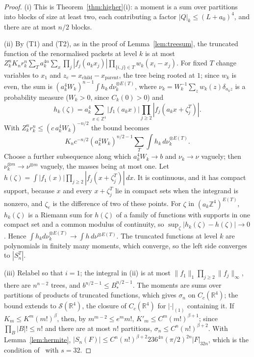 \documentclass[aps,prd,twocolumn,superscriptaddress,nofootinbib,longbibliography,floatfix,amsmath,amssymb,10pt]{revtex4-2}
\theoremstyle{definition}
\theoremstyle{remark}
\newcommand{\R}{\mathbb{R}}
\newcommand{\Z}{\mathbb{Z}}
\begin{document}
\begin{proof}
(i) This is Theorem~\ref{thm:higher}(i): a moment is a sum over partitions
into blocks of size at least two, each contributing a factor
$|Q|_k\le(L+a_0)^4$, and there are at most $n/2$ blocks.

(ii) By (T1) and (T2), as in the proof of Lemma~\ref{lem:treesum}, the
truncated function of the renormalised packets at level $k$ is at most
$Z_k^nK_nr_k^n\sum_T a_k^{4n}\sum_x\prod_j|f_j(a_kx_j)|\prod_{\{i,j\}\in T}
w_k(x_i-x_j)$. For fixed $T$ change variables to $x_1$ and
$z_e=x_{\mathrm{child}}-x_{\mathrm{parent}}$, the tree being rooted at $1$;
since $w_k$ is even, the sum is $(a_k^4W_k)^{n-1}\int h_k\,d\nu_k^{\otimes
E(T)}$, where $\nu_k=W_k^{-1}\sum_zw_k(z)\delta_{a_kz}$ is a probability
measure ($W_k>0$, since $C_k(0)>0$) and
\[
h_k(\zeta)=a_k^4\sum_{x\in\Z^4}|f_1(a_kx)|\prod_{j\ge2}|f_j(a_kx+\zeta^T_j)| .
\]
With $Z_k^nr_k^n\le(c\,a_k^4W_k)^{-n/2}$ the bound becomes
\[
K_nc^{-n/2}(a_k^4W_k)^{n/2-1}\sum_T\int h_k\,d\nu_k^{\otimes E(T)} .
\]
Choose a
further subsequence along which $a_k^4W_k\to b$ and $\nu_k\to\nu$ vaguely;
then $\nu_k^{\otimes m}\to\nu^{\otimes m}$ vaguely, the masses being at most
one. Let $h(\zeta)=\int|f_1(x)|\prod_{j\ge2}|f_j(x+\zeta^T_j)|\,dx$. It is
continuous, and it has compact support, because $x$ and every
$x+\zeta^T_j$ lie in compact sets when the integrand is nonzero, and
$\zeta_e$ is the difference of two of these points. For $\zeta$ in
$(a_k\Z^4)^{E(T)}$, $h_k(\zeta)$ is a Riemann sum for $h(\zeta)$ of a
family of functions with supports in one compact set and a common modulus
of continuity, so $\sup_\zeta|h_k(\zeta)-h(\zeta)|\to0$. Hence $\int
h_kd\nu_k^{\otimes E(T)}\to\int h\,d\nu^{\otimes E(T)}$. The truncated
functions at level $k$ are polynomials in finitely many moments, which
converge, so the left side converges to $|S^T_n|$.

(iii) Relabel so that $i=1$; the integral in (ii) is at most
$\|f_1\|_1\prod_{j\ge2}\|f_j\|_\infty$, there are $n^{n-2}$ trees, and
$b^{n/2-1}\le B_*^{n/2-1}$. The moments are sums over partitions of products
of truncated functions, which gives $\sigma_n$ on $C_c(\R^4)$; the bound
extends to $\mathcal S(\R^4)$, the closure of $C_c(\R^4)$ for
$|\cdot|_{(1)}$ containing it. If $K_m\le K^m(m!)^\beta$, then, by
$m^{m-2}\le e^mm!$, $K'_m\le C^m(m!)^{\beta+1}$; since $\prod_B|B|!\le n!$
and there are at most $n!$ partitions, $\sigma_n\le C^n(n!)^{\beta+2}$.
With Lemma~\ref{lem:hermite}, $|S_n(F)|\le C^n(n!)^{\beta+2}236^{4n}
(\pi/2)^{2n}|F|_{32n}$, which is the condition of~\cite{OS75} with $s=32$.


\end{proof}
\end{document}
